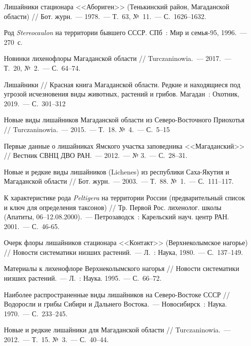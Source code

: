 \begin{thebibliography}{99}
\bibitem{} Лишайники стационара <<Абориген>> (Тенькинский район, Магаданской области) // Бот. журн.~--- 1978.~--- Т.~63, №~11.~--- С.~1626--1632.

\bibitem{} Род \textit{Stereocaulon} на территории бывшего СССР. СПб~: Мир и семья-95, 1996.~--- 270~с.

\bibitem{} Новинки лихенофлоры Магаданской области // Turczaninowia.~--- 2017.~--- Т.~20, №~2.~--- С.~64--74.

\bibitem{} Лишайники // Красная книга Магаданской области. Редкие и находящиеся под угрозой исчезновения виды животных, растений и грибов. Магадан~: Охотник, 2019.~--- С.~301--312

\bibitem{} Новые виды лишайников Магаданской области из Северо-Восточного Приохотья // Turczaninowia.~--- 2015.~--- Т.~18. №~4.~--- С.~5--15

\bibitem{} Первые данные о лишайниках Ямского участка заповедника <<Магаданский>> // Вестник СВНЦ ДВО РАН.~--- 2012.~--- № 3.~--- С.~28--31.

\bibitem{} Новые и редкие виды лишайников (Lichenes) из республики Саха-Якутия и Магаданской области // Бот. журн.~--- 2003.~--- Т.~88. №~1.~--- С.~111--117.

\bibitem{} К характеристике рода \textit{Peltigera} на территории России (предварительный список и ключ для определения таксонов) // Тр. Первой Рос. лихенолог. школы (Апатиты, 06–12.08.2000).~--- Петрозаводск~: Карельский науч. центр РАН. 2001.~--- С.~46-65.

\bibitem{} Очерк флоры лишайников стационара <<Контакт>> (Верхнеколымское нагорье) // Новости систематики низших растений.~--- Л.~: Наука, 1980.~--- С.~137--149.

\bibitem{} Материалы к лихенофлоре Верхнеколымского нагорья // Новости систематики низших растений.~--- Л.~: Наука. 1995.~--- С.~66--72.

\bibitem{} Наиболее распространенные виды лишайников на Северо-Востоке СССР // Водоросли и грибы Сибири и Дальнего Востока.~--- Новосибирск~: Наука. 1970.~--- С.~233--245.

\bibitem{} Новые и редкие лишайники для Магаданской области // Turczaninowia.~--- 2012.~--- Т.~15. №~3.~--- С.~40--44.


\end{thebibliography}
